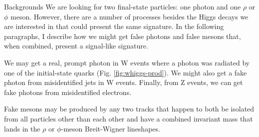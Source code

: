 \begin{section}{Backgrounds}
We are looking for two final-state particles: one photon and one $\rho$ or $\phi$ meson. However, there are a number of processes besides the Higgs decays we are interested in that could present the same signature. In the following paragraphs, I describe how we might get false photons and false mesons that, when combined, present a signal-like signature.

We may get a real, prompt photon in W events where a photon was radiated by one of the initial-state quarks (Fig. \ref{fig:whiggs-prod}). We might also get a fake photon from misidentified jets in W events. Finally, from Z events, we can get fake photons from misidentified electrons.

Fake mesons may be produced by any two tracks that happen to both be isolated from all particles other than each other and have a combined invariant mass that lands in the $\rho$ or $\phi$-meson Breit-Wigner lineshapes.
\end{section}

